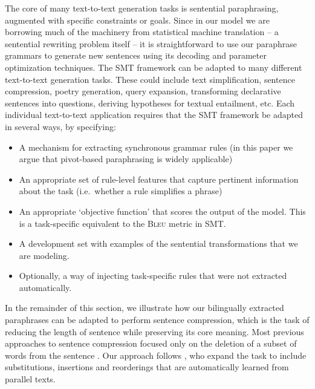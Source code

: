 \documentclass[11pt]{article}
\begin{document}
The core of many text-to-text generation tasks is sentential
paraphrasing, augmented with specific constraints or goals. Since in
our model we are borrowing much of the machinery from statistical
machine translation -- a sentential rewriting problem itself -- it is
straightforward to use our paraphrase grammars to generate new
sentences using its decoding and parameter optimization
techniques. The SMT framework can be adapted to many different
text-to-text generation tasks.  These could include text
simplification, sentence compression, poetry generation, query
expansion, transforming declarative sentences into questions, deriving
hypotheses for textual entailment, etc.  Each individual text-to-text
application requires that the SMT framework be adapted in several
ways, by specifying:
\begin{itemize}
\item A mechanism for extracting synchronous grammar rules (in this
  paper we argue that pivot-based paraphrasing is widely applicable)
\item An appropriate set of rule-level features that capture pertinent
  information about the task (i.e.\ whether a rule simplifies a
  phrase)
\item An appropriate `objective function' that scores the output of
  the model.  This is a task-specific equivalent to the \textsc{Bleu} metric
  \cite{Papineni2002} in SMT.
\item A development set with examples of the sentential
  transformations that we are modeling.
\item Optionally, a way of injecting task-specific rules that were not
  extracted automatically.
\end{itemize} 
In the remainder of this section, we illustrate how our bilingually
extracted paraphrases can be adapted to perform sentence compression,
which is the task of reducing the length of sentence while preserving
its core meaning.  Most previous approaches to sentence compression
focused only on the deletion of a subset of words from the sentence
\cite{KnightMarcuAI02}.  Our approach follows
, who expand the task to include
substitutions, insertions and reorderings that are automatically
learned from parallel texts.
\end{document}
